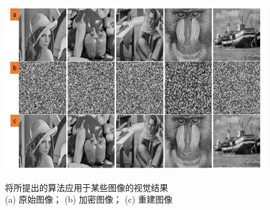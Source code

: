 \begin{figure}[ht]
    \begin{center}
        \includegraphics[width=\textwidth]{figure/p4.png}\\
    \end{center}
    \caption{将所提出的算法应用于某些图像的视觉结果\\ 
    (a) 原始图像； (b) 加密图像； (c) 重建图像 \label{fig:4.2}}
\end{figure}


